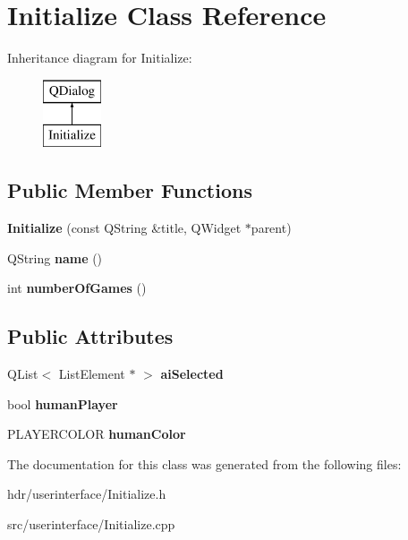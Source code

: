 \section{Initialize Class Reference}
\label{class_initialize}
Inheritance diagram for Initialize\-:\begin{figure}[H]
\begin{center}
\leavevmode
\includegraphics[height=2.000000cm]{class_initialize}
\end{center}
\end{figure}
\subsection*{Public Member Functions}
\begin{DoxyCompactItemize}
\item 
{\bfseries Initialize} (const Q\-String \&title, Q\-Widget $\ast$parent)\label{class_initialize_ac74c7a2fe5cdf5499d0798d4e487f819}

\item 
Q\-String {\bfseries name} ()\label{class_initialize_aad22139b103dbcc5ba568eec9e68e270}

\item 
int {\bfseries number\-Of\-Games} ()\label{class_initialize_a3aa15f1e0f87b9abf1c76af3acb6bd60}

\end{DoxyCompactItemize}
\subsection*{Public Attributes}
\begin{DoxyCompactItemize}
\item 
Q\-List$<$ List\-Element $\ast$ $>$ {\bfseries ai\-Selected}\label{class_initialize_a43be312fa27dc86f3bf50bdd7f7eb679}

\item 
bool {\bfseries human\-Player}\label{class_initialize_af02a36f3bd4d873b02c1abea354458aa}

\item 
P\-L\-A\-Y\-E\-R\-C\-O\-L\-O\-R {\bfseries human\-Color}\label{class_initialize_afe9fb1b2a5942539062b8780c993aa2f}

\end{DoxyCompactItemize}


The documentation for this class was generated from the following files\-:\begin{DoxyCompactItemize}
\item 
hdr/userinterface/Initialize.\-h\item 
src/userinterface/Initialize.\-cpp\end{DoxyCompactItemize}
